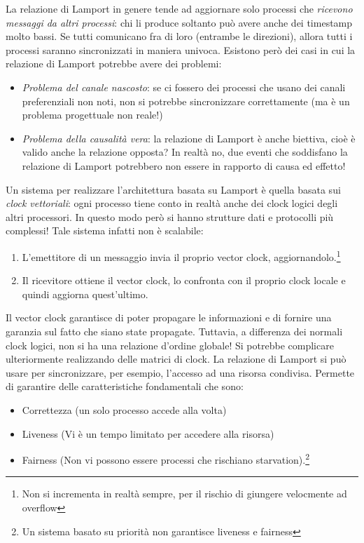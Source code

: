 La relazione di Lamport in genere tende ad aggiornare solo processi che \textit{ricevono messaggi da altri processi}:
chi li produce soltanto può avere anche dei timestamp molto bassi. Se tutti comunicano fra di loro (entrambe le
direzioni), allora tutti i processi saranno sincronizzati in maniera univoca. Esistono però dei casi in cui la relazione
di Lamport potrebbe avere dei problemi:
\begin{itemize}
 \item \textit{Problema del canale nascosto}: se ci fossero dei processi che usano dei canali preferenziali non noti,
 non si potrebbe sincronizzare correttamente (ma è un problema progettuale non reale!)
 \item \textit{Problema della causalità vera}: la relazione di Lamport è anche biettiva, cioè è valido anche la
 relazione opposta? In realtà no, due eventi che soddisfano la relazione di Lamport potrebbero non essere in rapporto
 di causa ed effetto!
\end{itemize}
Un sistema per realizzare l'architettura basata su Lamport è quella basata sui \textit{clock vettoriali}: ogni
processo tiene conto in realtà anche dei clock logici degli altri processori. In questo modo però si hanno strutture
dati e protocolli più complessi! Tale sistema infatti non è scalabile:
\begin{enumerate}
 \item L'emettitore di un messaggio invia il proprio vector clock, aggiornandolo.\footnote{Non si incrementa in realtà
sempre, per il rischio di giungere velocmente ad overflow}
 \item Il ricevitore ottiene il vector clock, lo confronta con il proprio clock locale e quindi aggiorna quest'ultimo.
\end{enumerate}
Il vector clock garantisce di poter propagare le informazioni e di fornire una garanzia sul fatto che siano state
propagate. Tuttavia, a differenza dei normali clock logici, non si ha una relazione d'ordine globale! Si potrebbe
complicare ulteriormente realizzando delle matrici di clock.
La relazione di Lamport si può usare per sincronizzare, per esempio, l'accesso ad una risorsa condivisa. Permette di
garantire delle caratteristiche fondamentali che sono:
\begin{itemize}
 \item Correttezza (un solo processo accede alla volta)
 \item Liveness (Vi è un tempo limitato per accedere alla risorsa)
 \item Fairness (Non vi possono essere processi che rischiano starvation).\footnote{Un sistema basato su priorità non
 garantisce liveness e fairness}
\end{itemize}
